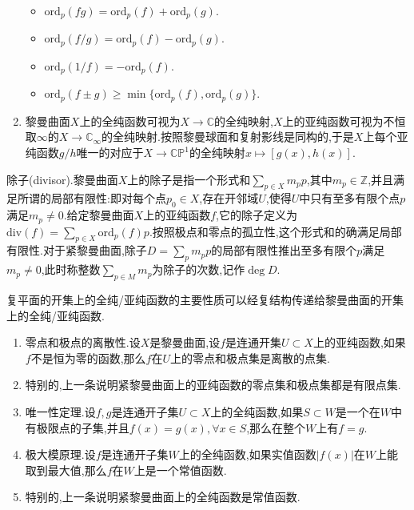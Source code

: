 \begin{enumerate}
\begin{itemize}
		\item $\mathrm{ord}_p(fg)=\mathrm{ord}_p(f)+\mathrm{ord}_p(g)$.
		\item $\mathrm{ord}_p(f/g)=\mathrm{ord}_p(f)-\mathrm{ord}_p(g)$.
		\item $\mathrm{ord}_p(1/f)=-\mathrm{ord}_p(f)$.
		\item $\mathrm{ord}_p(f\pm g)\ge\min\{\mathrm{ord}_p(f),\mathrm{ord}_p(g)\}$.
	\end{itemize}
    \item 黎曼曲面$X$上的全纯函数可视为$X\to\mathbb{C}$的全纯映射,$X$上的亚纯函数可视为不恒取$\infty$的$X\to\mathbb{C}_{\infty}$的全纯映射.按照黎曼球面和复射影线是同构的,于是$X$上每个亚纯函数$g/h$唯一的对应于$X\to\mathbb{CP}^1$的全纯映射$x\mapsto[g(x),h(x)]$.
\end{enumerate}

除子(divisor).黎曼曲面$X$上的除子是指一个形式和$\sum_{p\in X}m_pp$,其中$m_p\in\mathbb{Z}$,并且满足所谓的局部有限性:即对每个点$p_0\in X$,存在开邻域$U$,使得$U$中只有至多有限个点$p$满足$m_p\not=0$.给定黎曼曲面$X$上的亚纯函数$f$,它的除子定义为$\mathrm{div}(f)=\sum_{p\in X}\mathrm{ord}_p(f)p$.按照极点和零点的孤立性,这个形式和的确满足局部有限性.对于紧黎曼曲面,除子$D=\sum_pm_pp$的局部有限性推出至多有限个$p$满足$m_p\not=0$,此时称整数$\sum_{p\in M}m_p$为除子的次数,记作$\deg D$.

复平面的开集上的全纯/亚纯函数的主要性质可以经复结构传递给黎曼曲面的开集上的全纯/亚纯函数.
\begin{enumerate}
	\item 零点和极点的离散性.设$X$是黎曼曲面,设$f$是连通开集$U\subset X$上的亚纯函数,如果$f$不是恒为零的函数,那么$f$在$U$上的零点和极点集是离散的点集.
	\item 特别的,上一条说明紧黎曼曲面上的亚纯函数的零点集和极点集都是有限点集.
	\item 唯一性定理.设$f,g$是连通开子集$U\subset X$上的全纯函数,如果$S\subset W$是一个在$W$中有极限点的子集,并且$f(x)=g(x),\forall x\in S$,那么在整个$W$上有$f=g$.
	\item 极大模原理.设$f$是连通开子集$W$上的全纯函数,如果实值函数$|f(x)|$在$W$上能取到最大值,那么$f$在$W$上是一个常值函数.
	\item 特别的,上一条说明紧黎曼曲面上的全纯函数是常值函数.
\end{enumerate}

